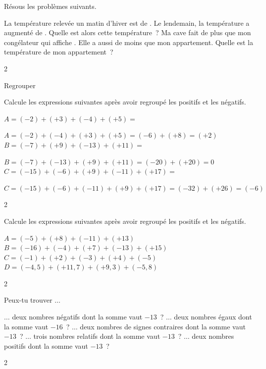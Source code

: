 \documentclass[a4paper,11pt]{report}
\begin{document}
\begin{exo}
{Résous les problèmes suivants.
\begin{tasks}
\task La température relevée un matin d'hiver est de . Le lendemain, la température a augmenté de . Quelle est alors cette température~?
\task Ma cave fait  de plus que mon congélateur qui affiche . Elle a aussi  de moins que mon appartement. Quelle est la température de mon appartement~?
\end{tasks}
}{2}
\end{exo}

\begin{resolu}{Regrouper}
{Calcule les expressions suivantes après avoir regroupé les positifs et les négatifs.
\begin{tasks}
\task $A=(-2)+(+3)+(-4)+(+5)=$

$A=(-2)+(-4)+(+3)+(+5)=(-6)+(+8)=(+2)$
\task $B=(-7)+(+9)+(-13)+(+11)=$

$B=(-7)+(-13)+(+9)+(+11)=(-20)+(+20)=0$
\task $C=(-15)+(-6)+(+9)+(-11)+(+17)=$

$C=(-15)+(-6)+(-11)+(+9)+(+17)=(-32)+(+26)=(-6)$
\end{tasks}
}{2}
\end{resolu}


\begin{exo}
{Calcule les expressions suivantes après avoir regroupé les positifs et les négatifs.
\begin{tasks}
\task $A=(-5)+(+8)+(-11)+(+13)$
\task $B=(-16)+(-4)+(+7)+(-13)+(+15)$
\task $C=(-1)+(+2)+(-3)+(+4)+(-5)$
\task $D=(-4,5)+(+11,\!7)+(+9,\!3)+(-5,\!8)$
\end{tasks}
}{2}
\end{exo}

\begin{exo}
{Peux-tu trouver $\ldots$
\begin{tasks}
\task $\ldots$ deux nombres négatifs dont la somme vaut $-13$~?
\task $\ldots$ deux nombres égaux dont la somme vaut $-16$~?
\task $\ldots$ deux nombres de signes contraires dont la somme vaut $-13$~?
\task $\ldots$ trois nombres relatifs dont la somme vaut $-13$~?
\task $\ldots$ deux nombres positifs dont la somme vaut $-13$~?
\end{tasks}
}{2}
\end{exo}

\end{document}
